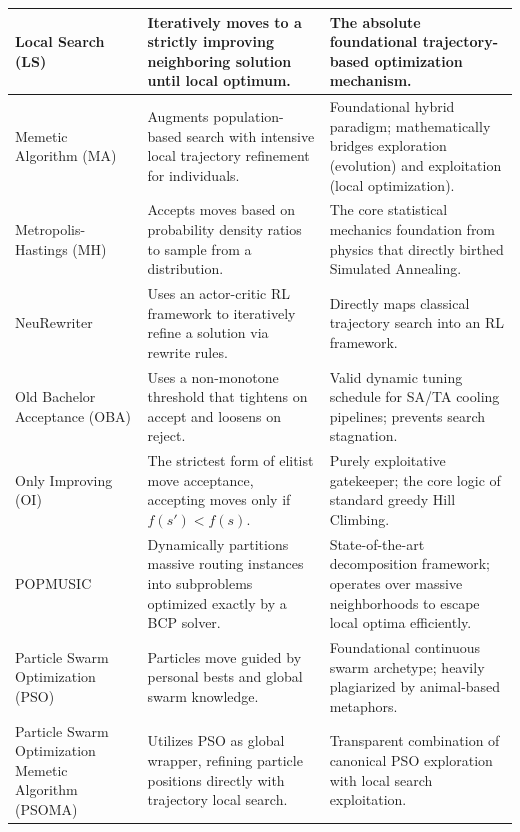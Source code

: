 \documentclass[orivec,runningheads]{llncs}
\begin{document}
\begin{center}
\begin{longtable}
\begin{center}
\begin{longtable}{
  >{\raggedright\arraybackslash}p{}
  >{\raggedright\arraybackslash}p{}
  >{\raggedright\arraybackslash}p{}
}
Local Search (LS) & Iteratively moves to a strictly improving neighboring solution until local optimum. & The absolute foundational trajectory-based optimization mechanism. \\ \midrule

Memetic Algorithm (MA) & Augments population-based search with intensive local trajectory refinement for individuals. & Foundational hybrid paradigm; mathematically bridges exploration (evolution) and exploitation (local optimization). \\ \midrule

Metropolis-Hastings (MH) & Accepts moves based on probability density ratios to sample from a distribution. & The core statistical mechanics foundation from physics that directly birthed Simulated Annealing. \\ \midrule

NeuRewriter & Uses an actor-critic RL framework to iteratively refine a solution via rewrite rules. & Directly maps classical trajectory search into an RL framework. \\ \midrule

Old Bachelor Acceptance (OBA) & Uses a non-monotone threshold that tightens on accept and loosens on reject. & Valid dynamic tuning schedule for SA/TA cooling pipelines; prevents search stagnation. \\ \midrule

Only Improving (OI) & The strictest form of elitist move acceptance, accepting moves only if $f(s') < f(s)$. & Purely exploitative gatekeeper; the core logic of standard greedy Hill Climbing. \\ \midrule

POPMUSIC & Dynamically partitions massive routing instances into subproblems optimized exactly by a BCP solver. & State-of-the-art decomposition framework; operates over massive neighborhoods to escape local optima efficiently. \\ \midrule

Particle Swarm Optimization (PSO) & Particles move guided by personal bests and global swarm knowledge. & Foundational continuous swarm archetype; heavily plagiarized by animal-based metaphors. \\ \midrule

Particle Swarm Optimization Memetic Algorithm (PSOMA) & Utilizes PSO as global wrapper, refining particle positions directly with trajectory local search. & Transparent combination of canonical PSO exploration with local search exploitation. \\ \midrule


\end{longtable}
\end{center}
\end{longtable}
\end{center}
\end{document}
